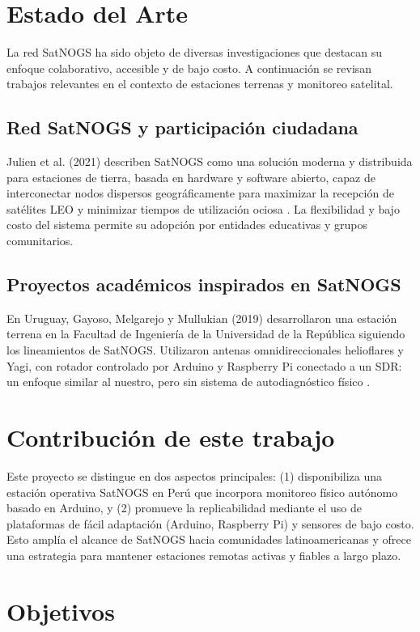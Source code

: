 \documentclass[conference]{IEEEtran}
\begin{document}
\section{Estado del Arte}

La red SatNOGS ha sido objeto de diversas investigaciones que destacan su enfoque colaborativo, accesible y de bajo costo. A continuación se revisan trabajos relevantes en el contexto de estaciones terrenas y monitoreo satelital.

\subsection{Red SatNOGS y participación ciudadana}
Julien et al. (2021) describen SatNOGS como una solución moderna y distribuida para estaciones de tierra, basada en hardware y software abierto, capaz de interconectar nodos dispersos geográficamente para maximizar la recepción de satélites LEO y minimizar tiempos de utilización ociosa \cite{julien2021satnogs}. La flexibilidad y bajo costo del sistema permite su adopción por entidades educativas y grupos comunitarios.

\subsection{Proyectos académicos inspirados en SatNOGS}
En Uruguay, Gayoso, Melgarejo y Mullukian (2019) desarrollaron una estación terrena en la Facultad de Ingeniería de la Universidad de la República siguiendo los lineamientos de SatNOGS. Utilizaron antenas omnidireccionales helioflares y Yagi, con rotador controlado por Arduino y Raspberry Pi conectado a un SDR: un enfoque similar al nuestro, pero sin sistema de autodiagnóstico físico \cite{gayoso2019estacion}.

\section{Contribución de este trabajo}
Este proyecto se distingue en dos aspectos principales: (1) disponibiliza una estación operativa SatNOGS en Perú que incorpora monitoreo físico autónomo basado en Arduino, y (2) promueve la replicabilidad mediante el uso de plataformas de fácil adaptación (Arduino, Raspberry Pi) y sensores de bajo costo. Esto amplía el alcance de SatNOGS hacia comunidades latinoamericanas y ofrece una estrategia para mantener estaciones remotas activas y fiables a largo plazo.

\section{Objetivos}
\end{document}
